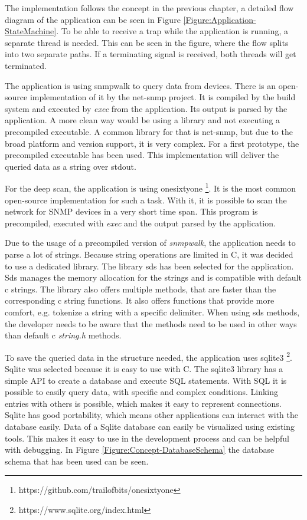\label{Section:Implementation}

The implementation follows the concept in the previous chapter, a detailed flow diagram of the application can be seen in Figure \ref{Figure:Application-StateMachine}. To be able to receive a trap while the application is running, a separate thread is needed. This can be seen in the figure, where the flow splits into two separate paths. If a terminating signal is received, both threads will get terminated.

The application is using snmpwalk to query data from devices. There is an open-source implementation of it by the net-snmp project. It is compiled by the build system and executed by \textit{exec} from the application. Its output is parsed by the application. A more clean way would be using a library and not executing a precompiled executable. A common library for that is net-snmp, but due to the broad platform and version support, it is very complex. For a first prototype, the precompiled executable has been used. This implementation will deliver the queried data as a string over stdout.

For the deep scan, the application is using onesixtyone \footnote{https://github.com/trailofbits/onesixtyone}. It is the most common open-source implementation for such a task. With it, it is possible to scan the network for SNMP devices in a very short time span. This program is precompiled, executed with \textit{exec} and the output parsed by the application.

Due to the usage of a precompiled version of \textit{snmpwalk}, the application needs to parse a lot of strings. Because string operations are limited in C, it was decided to use a dedicated library. The library sds has been selected for the application. Sds manages the memory allocation for the strings and is compatible with default c strings. The library also offers multiple methods, that are faster than the corresponding c string functions. It also offers functions that provide more comfort, e.g. tokenize a string with a specific delimiter. When using sds methods, the developer needs to be aware that the methods need to be used in other ways than default c \textit{string.h} methods.

To save the queried data in the structure needed, the application uses sqlite3 \footnote{https://www.sqlite.org/index.html}. Sqlite was selected because it is easy to use with C. The sqlite3 library has a simple API to create a database and execute SQL statements. With SQL it is possible to easily query data, with specific and complex conditions. Linking entries with others is possible, which makes it easy to represent connections. Sqlite has good portability, which means other applications can interact with the database easily. Data of a Sqlite database can easily be visualized using existing tools. This makes it easy to use in the development process and can be helpful with debugging. In Figure \ref{Figure:Concept-DatabaseSchema} the database schema that has been used can be seen.

